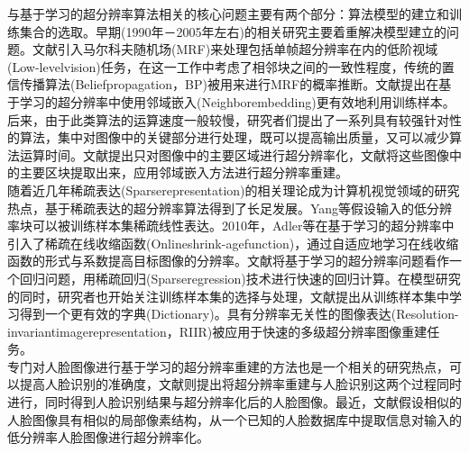 \documentclass[]{article}
\begin{document}
    与基于学习的超分辨率算法相关的核心问题主要有两个部分：算法模型的建立和训练集合的选取。早期(1990年－2005年左右)的相关研究主要着重解决模型建立的问题。文献引入马尔科夫随机场(MRF)来处理包括单帧超分辨率在内的低阶视域(Low-levelvision)任务，在这一工作中考虑了相邻块之间的一致性程度，传统的置信传播算法(Beliefpropagation，BP)被用来进行MRF的概率推断。文献提出在基于学习的超分辨率中使用邻域嵌入(Neighborembedding)更有效地利用训练样本。后来，由于此类算法的运算速度一般较慢，研究者们提出了一系列具有较强针对性的算法，集中对图像中的关键部分进行处理，既可以提高输出质量，又可以减少算法运算时间。文献提出只对图像中的主要区域进行超分辨率化，文献将这些图像中的主要区块提取出来，应用邻域嵌入方法进行超分辨率重建。\\

    随着近几年稀疏表达(Sparserepresentation)的相关理论成为计算机视觉领域的研究热点，基于稀疏表达的超分辨率算法得到了长足发展。Yang等假设输入的低分辨率块可以被训练样本集稀疏线性表达。2010年，Adler等在基于学习的超分辨率中引入了稀疏在线收缩函数(Onlineshrink-agefunction)，通过自适应地学习在线收缩函数的形式与系数提高目标图像的分辨率。文献将基于学习的超分辨率问题看作一个回归问题，用稀疏回归(Sparseregression)技术进行快速的回归计算。在模型研究的同时，研究者也开始关注训练样本集的选择与处理，文献提出从训练样本集中学习得到一个更有效的字典(Dictionary)。具有分辨率无关性的图像表达(Resolution-invariantimagerepresentation，RIIR)被应用于快速的多级超分辨率图像重建任务。\\
    
    专门对人脸图像进行基于学习的超分辨率重建的方法也是一个相关的研究热点，可以提高人脸识别的准确度，文献则提出将超分辨率重建与人脸识别这两个过程同时进行，同时得到人脸识别结果与超分辨率化后的人脸图像。最近，文献假设相似的人脸图像具有相似的局部像素结构，从一个已知的人脸数据库中提取信息对输入的低分辨率人脸图像进行超分辨率化。
\end{document}
